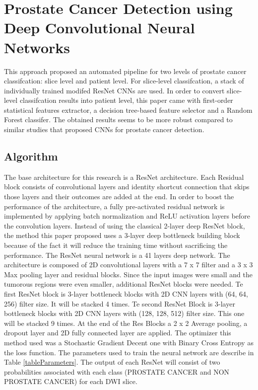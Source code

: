 \documentclass[runningheads,a4paper,11pt]{report}
\begin{document}
\section{Prostate Cancer Detection using Deep Convolutional Neural Networks}
\label{section:CNNApproach2}

This approach proposed an automated pipeline for two levels of prostate cancer classifcation: slice level and patient level. For slice-level classifcation, a stack of individually trained modifed ResNet CNNs are used. In order to convert slice-level classifcation results into patient level, this paper came with first-order statistical features extractor, a decision tree-based feature selector and a Random Forest classifer. The obtained results seems to be  more robust compared to similar studies that proposed CNNs for prostate cancer detection. \cite{deepCNN}

\subsection{Algorithm}
\label{section:algorithm}

The base architecture for this research is a ResNet architecture. Each Residual block consists of convolutional layers and identity shortcut connection that skips those layers and their outcomes are added at the end. In order to boost the performance of the architecture, a fully pre-activated residual network is implemented by applying  batch normalization and ReLU activation layers before the convolution layers. Instead of using the classical 2-layer deep ResNet block, the method this paper proposed uses a 3-layer deep bottleneck building block because of the fact it will reduce the training time without sacrificing the performance. The ResNet neural network is a 41 layers deep network. The architecture is composed of 2D convolutional layers with a 7 x 7 filter and a 3 x 3 Max pooling layer and residual blocks. Since the input images were small and the tumorous regions were even smaller, additional ResNet blocks were needed. Te first ResNet block is 3-layer bottleneck blocks with 2D CNN layers with (64, 64, 256) filter size. It will be stacked 4 times. Te second ResNet Block is 3-layer bottleneck blocks with 2D CNN layers with (128, 128, 512) filter size. This one will be stacked 9 times. At the end of the Res Blocks a 2 x 2 Average pooling, a dropout layer and 2D fully connected layer are applied. The optimizer this method used was a Stochastic Gradient Decent one with Binary Cross Entropy as the loss function.\cite{deepCNN} The parameters used to train the neural network are describe in Table \ref{tableParameters}.
The output of each ResNet will consist of two probabilities associated with each class (PROSTATE CANCER and NON PROSTATE CANCER) for each DWI slice.
\end{document}
